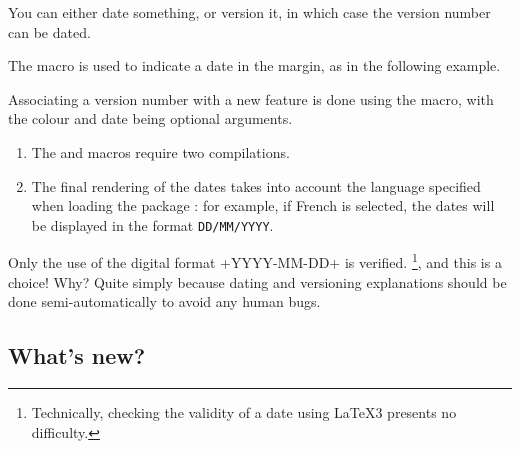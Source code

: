 You can either date something, or version it, in which case the version number can be dated.




\begin{tdocexa}
    The  macro is used to indicate a date in the margin, as in the following example.


\end{tdocexa}




\begin{tdocexa}
    Associating a version number with a new feature is done using the  macro, with the colour and date being optional arguments.


\end{tdocexa}


\begin{tdocimp}
    \begin{enumerate}
        \item The  and  macros require two compilations.

        \item The final rendering of the dates takes into account the language specified when loading the package \thispack{}: for example, if French is selected, the dates will be displayed in the format \texttt{DD/MM/YYYY}.
    \end{enumerate}
\end{tdocimp}


\begin{tdocwarn}
    Only the use of the digital format \tdocinlatex+YYYY-MM-DD+ is verified.
    \footnote{
        Technically, checking the validity of a date using \LaTeX3 presents no difficulty.
    },
    and this is a choice! Why? Quite simply because dating and versioning explanations should be done semi-automatically to avoid any human bugs.
\end{tdocwarn}


\subsection{What's new?}

